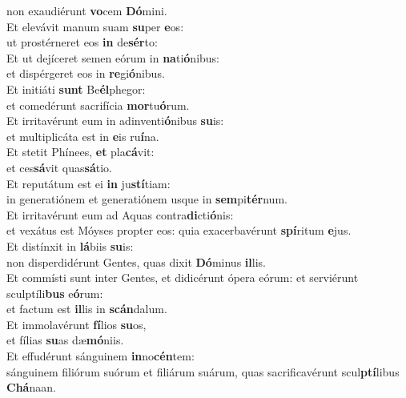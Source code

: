 \oddverse non exaudiérunt \textbf{vo}cem \textbf{Dó}mini.\\
\evenverse Et elevávit manum suam \textbf{su}per \textbf{e}os:~\*\\
\evenverse ut prostérneret eos \textbf{in} de\textbf{sér}to:\\
\oddverse Et ut dejíceret semen eórum in \textbf{na}ti\textbf{ó}nibus:~\*\\
\oddverse et dispérgeret eos in \textbf{re}gi\textbf{ó}nibus.\\
\evenverse Et initiáti \textbf{sunt} Be\textbf{él}phegor:~\*\\
\evenverse et comedérunt sacrifícia \textbf{mor}tu\textbf{ó}rum.\\
\oddverse Et irritavérunt eum in adinventi\textbf{ó}nibus \textbf{su}is:~\*\\
\oddverse et multiplicáta est in \textbf{e}is ru\textbf{í}na.\\
\evenverse Et stetit Phínees, \textbf{et} pla\textbf{cá}vit:~\*\\
\evenverse et ces\textbf{sá}vit quas\textbf{sá}tio.\\
\oddverse Et reputátum est ei \textbf{in} ju\textbf{stí}tiam:~\*\\
\oddverse in generatiónem et generatiónem usque in \textbf{sem}pi\textbf{tér}num.\\
\evenverse Et irritavérunt eum ad Aquas contra\textbf{di}cti\textbf{ó}nis:~\*\\
\evenverse et vexátus est Móyses propter eos: quia exacerbavérunt \textbf{spí}ritum \textbf{e}jus.\\
\oddverse Et distínxit in \textbf{lá}biis \textbf{su}is:~\*\\
\oddverse non disperdidérunt Gentes, quas dixit \textbf{Dó}minus \textbf{il}lis.\\
\evenverse Et commísti sunt inter Gentes, et didicérunt ópera eórum: et serviérunt sculptíli\textbf{bus} e\textbf{ó}rum:~\*\\
\evenverse et factum est \textbf{il}lis in \textbf{scán}dalum.\\
\oddverse Et immolavérunt \textbf{fí}lios \textbf{su}os,~\*\\
\oddverse et fílias \textbf{su}as dæ\textbf{mó}niis.\\
\evenverse Et effudérunt sánguinem \textbf{in}no\textbf{cén}tem:~\*\\
\evenverse sánguinem filiórum suórum et filiárum suárum, quas sacrificavérunt scul\textbf{ptí}libus \textbf{Chá}naan.\\
